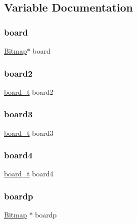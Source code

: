 \subsection{Variable Documentation}
\hypertarget{group___game_ga2b89423d3599327880528e2d4ef4d95a}{}\label{group___game_ga2b89423d3599327880528e2d4ef4d95a} 
\subsubsection{\texorpdfstring{board}{board}}
{\footnotesize\ttfamily \hyperlink{struct_bitmap}{Bitmap}$\ast$ board}

\hypertarget{group___game_gad024627d28eb323a7677e5a265535816}{}\label{group___game_gad024627d28eb323a7677e5a265535816} 
\subsubsection{\texorpdfstring{board2}{board2}}
{\footnotesize\ttfamily \hyperlink{structboard__t}{board\+\_\+t} board2}

\hypertarget{group___game_gae6800e5869326de6be9d0be65d58b373}{}\label{group___game_gae6800e5869326de6be9d0be65d58b373} 
\subsubsection{\texorpdfstring{board3}{board3}}
{\footnotesize\ttfamily \hyperlink{structboard__t}{board\+\_\+t} board3}

\hypertarget{group___game_gadb54bfdf7a3bb4d8e2835e93b2de8a09}{}\label{group___game_gadb54bfdf7a3bb4d8e2835e93b2de8a09} 
\subsubsection{\texorpdfstring{board4}{board4}}
{\footnotesize\ttfamily \hyperlink{structboard__t}{board\+\_\+t} board4}

\hypertarget{group___game_ga39e613d7078d5537d3bbaaa3aed89f62}{}\label{group___game_ga39e613d7078d5537d3bbaaa3aed89f62} 
\subsubsection{\texorpdfstring{boardp}{boardp}}
{\footnotesize\ttfamily \hyperlink{struct_bitmap}{Bitmap} $\ast$ boardp}

